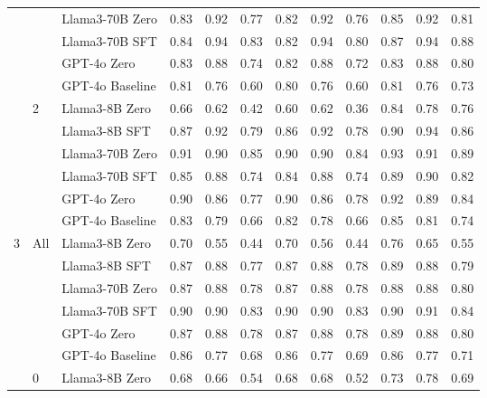 \begin{longtable}[t]{ll>{}l|rr>{}r|rr>{}r|rrr}
 &  & Llama3-70B Zero & 0.83 & 0.92 & 0.77 & 0.82 & 0.92 & 0.76 & 0.85 & 0.92 & 0.81\\

 &  & Llama3-70B SFT & 0.84 & 0.94 & 0.83 & 0.82 & 0.94 & 0.80 & 0.87 & 0.94 & 0.88\\

 &  & GPT-4o Zero & 0.83 & 0.88 & 0.74 & 0.82 & 0.88 & 0.72 & 0.83 & 0.88 & 0.80\\

 &  & GPT-4o Baseline & 0.81 & 0.76 & 0.60 & 0.80 & 0.76 & 0.60 & 0.81 & 0.76 & 0.73\\
\cmidrule{2-12}
 & 2 & Llama3-8B Zero & 0.66 & 0.62 & 0.42 & 0.60 & 0.62 & 0.36 & 0.84 & 0.78 & 0.76\\

 &  & Llama3-8B SFT & 0.87 & 0.92 & 0.79 & 0.86 & 0.92 & 0.78 & 0.90 & 0.94 & 0.86\\

 &  & Llama3-70B Zero & 0.91 & 0.90 & 0.85 & 0.90 & 0.90 & 0.84 & 0.93 & 0.91 & 0.89\\

 &  & Llama3-70B SFT & 0.85 & 0.88 & 0.74 & 0.84 & 0.88 & 0.74 & 0.89 & 0.90 & 0.82\\

 &  & GPT-4o Zero & 0.90 & 0.86 & 0.77 & 0.90 & 0.86 & 0.78 & 0.92 & 0.89 & 0.84\\

 &  & GPT-4o Baseline & 0.83 & 0.79 & 0.66 & 0.82 & 0.78 & 0.66 & 0.85 & 0.81 & 0.74\\
\cmidrule{1-12}
3 & All & Llama3-8B Zero & 0.70 & 0.55 & 0.44 & 0.70 & 0.56 & 0.44 & 0.76 & 0.65 & 0.55\\

 &  & Llama3-8B SFT & 0.87 & 0.88 & 0.77 & 0.87 & 0.88 & 0.78 & 0.89 & 0.88 & 0.79\\

 &  & Llama3-70B Zero & 0.87 & 0.88 & 0.78 & 0.87 & 0.88 & 0.78 & 0.88 & 0.88 & 0.80\\

 &  & Llama3-70B SFT & 0.90 & 0.90 & 0.83 & 0.90 & 0.90 & 0.83 & 0.90 & 0.91 & 0.84\\

 &  & GPT-4o Zero & 0.87 & 0.88 & 0.78 & 0.87 & 0.88 & 0.78 & 0.89 & 0.88 & 0.80\\

 &  & GPT-4o Baseline & 0.86 & 0.77 & 0.68 & 0.86 & 0.77 & 0.69 & 0.86 & 0.77 & 0.71\\
\cmidrule{2-12}
 & 0 & Llama3-8B Zero & 0.68 & 0.66 & 0.54 & 0.68 & 0.68 & 0.52 & 0.73 & 0.78 & 0.69\\


\end{longtable}
